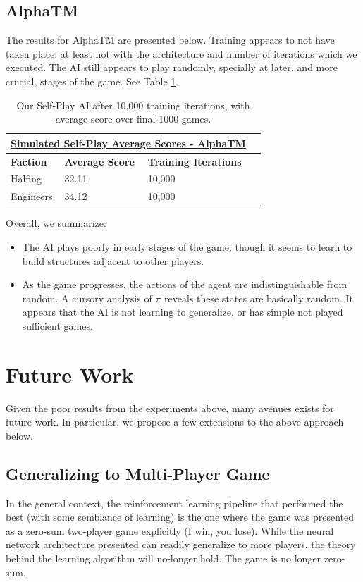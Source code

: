 \documentclass[10pt,twocolumn,letterpaper]{article}
\begin{document}
\subsection{AlphaTM}
The results for AlphaTM are presented below. Training appears to not have taken place, at least not with the architecture and number of iterations which we executed. The AI still appears to play randomly, specially at later, and more crucial, stages of the game. See Table \ref{table:average_2p_score_alpha_tm}.


\begin{table}[!ht]
\begin{tabular}{|l|l|l|l|}
\hline
\multicolumn{3}{|c|}{{\ul \textbf{Simulated Self-Play Average Scores - AlphaTM}}}      \\ \hline
\textbf{Faction} & \textbf{Average Score} & \textbf{Training Iterations} \\ \hline
Halfing          & 32.11                 & 10,000                   \\ \hline
Engineers        & 34.12                 & 10,000                 \\ \hline
\end{tabular}
\caption{Our Self-Play AI after 10,000 training iterations, with average score over final 1000 games.}
\label{table:average_2p_score_alpha_tm}
\end{table}

Overall, we summarize:
\begin{itemize}
    \item The AI plays poorly in early stages of the game, though it seems to learn to build structures adjacent to other players.
    \item As the game progresses, the actions of the agent are indistinguishable from random. A cursory analysis of $\pi$ reveals these states are basically random. It appears that the AI is not learning to generalize, or has simple not played sufficient games.
\end{itemize}

\section{Future Work}
Given the poor results from the experiments above, many avenues exists for future work. In particular, we propose a few extensions to the above approach below.

\subsection{Generalizing to Multi-Player Game}
In the general context, the reinforcement learning pipeline that performed the best (with some semblance of learning) is the one where the game was presented as a zero-sum two-player game explicitly (I win, you lose). While the neural network architecture presented can readily generalize to more players, the theory behind the learning algorithm will no-longer hold. The game is no longer zero-sum.
\end{document}
